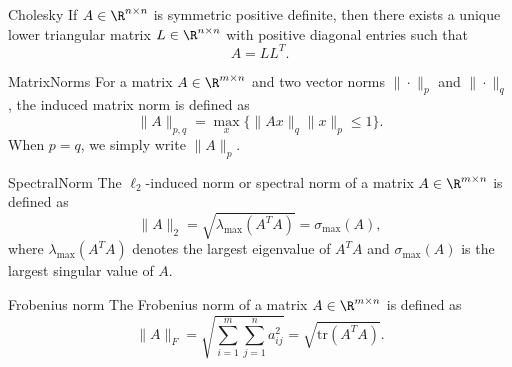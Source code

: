 \begin{theo}{Cholesky}
    If $A \in \R^{n \times n}$ is symmetric positive definite, then there exists a unique lower triangular matrix $L \in \R^{n \times n}$ with positive diagonal entries such that
    \begin{equation*}
        A = LL^T.
    \end{equation*}
    \vspace*{-0.5cm}
\end{theo}

\begin{theo}{MatrixNorms}
    For a matrix $A \in \R^{m \times n}$ and two vector norms $\|\cdot\|_p$ and $\|\cdot\|_q$, the induced matrix norm is defined as 
    \begin{equation*}
        \|A\|_{p,q} = \max_{x} \{ \|Ax\|_q \|x\|_p \leq 1 \}.
    \end{equation*}
    When $p = q$, we simply write $\|A\|_p$. 
\end{theo}

\begin{ex}{SpectralNorm}
    The $\ell_2$-induced norm or spectral norm of a matrix $A \in \R^{m \times n}$ is defined as
    \begin{equation*}
        \|A\|_2 = \sqrt{\lambda_{\max}(A^T A)} = \sigma_{\max}(A),
    \end{equation*}
    where $\lambda_{\max}(A^T A)$ denotes the largest eigenvalue of $A^T A$ and $\sigma_{\max}(A)$ is the largest singular value of $A$.
\end{ex}

\begin{ex}{Frobenius norm}
    The Frobenius norm of a matrix $A \in \R^{m \times n}$ is defined as
    \begin{equation*}
        \|A\|_F = \sqrt{\sum_{i=1}^m \sum_{j=1}^n a_{ij}^2} = \sqrt{\text{tr}(A^T A)}.
    \end{equation*}
    \vspace{-0.5cm}
\end{ex}

